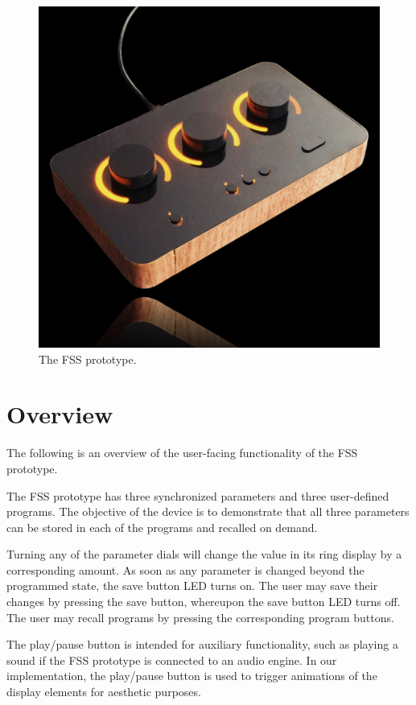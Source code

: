 \documentclass[conference]{IEEEtran}
\begin{document}
\begin{figure}[bhtp]
    \centering
    \includegraphics[width=\columnwidth]{./resources/figures/fss_cover_art.png}
    \caption{The FSS prototype.}
    \label{fig:fss_cover_art}
\end{figure}

\section{Overview}

The following is an overview of the user-facing functionality of the FSS prototype.

The FSS prototype has three synchronized parameters and three user-defined programs. The objective of the device is to demonstrate that all three parameters can be stored in each of the programs and recalled on demand.

Turning any of the parameter dials will change the value in its ring display by a corresponding amount. As soon as any parameter is changed beyond the programmed state, the save button LED turns on. The user may save their changes by pressing the save button, whereupon the save button LED turns off. The user may recall programs by pressing the corresponding program buttons.

The play/pause button is intended for auxiliary functionality, such as playing a sound if the FSS prototype is connected to an audio engine. In our implementation, the play/pause button is used to trigger animations of the display elements for aesthetic purposes.
\end{document}
